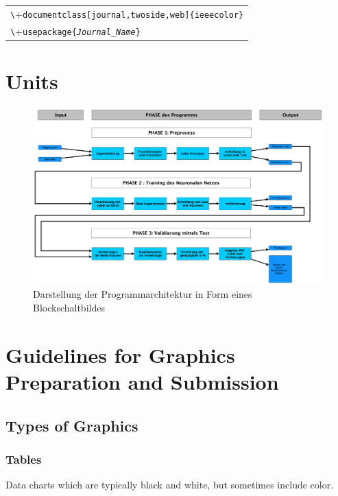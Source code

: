\documentclass[journal,twoside,web]{ieeecolor}
\begin{document}
\smallskip\noindent
\begin{small}
\begin{tabular}{l}
\verb+\+\texttt{documentclass[journal,twoside,web]\{ieeecolor\}}\\
\verb+\+\texttt{usepackage\{\textit{Journal\_Name}\}}
\end{tabular}
\end{small}

\section{Units}

\begin{figure}[!t]
\centerline{\includegraphics[width=\columnwidth]{Architektur.png}}
\caption{Darstellung der Programmarchitektur in Form eines Blockschaltbildes}
\label{fig1}
\end{figure}


\section{Guidelines for Graphics Preparation and Submission}
\label{sec:guidelines}

\subsection{Types of Graphics}

\subsubsection{Tables}
{Data charts which are typically black and white, but sometimes include 
color.}
\end{document}

